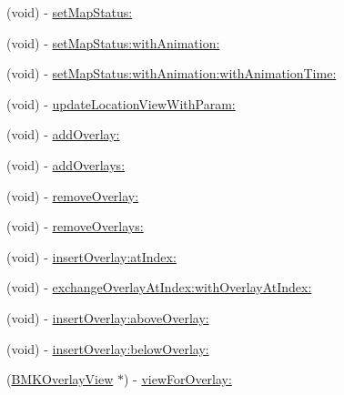 \begin{DoxyCompactItemize}
\item 
(void) -\/ \hyperlink{interface_b_m_k_map_view_a595b3baaa42f35fd5fa3b778011a59d7}{set\-Map\-Status\-:}
\item 
(void) -\/ \hyperlink{interface_b_m_k_map_view_abf8e2308ae62e367f8b1271a9918060f}{set\-Map\-Status\-:with\-Animation\-:}
\item 
(void) -\/ \hyperlink{interface_b_m_k_map_view_a9668d8aa419c7a9140c79846fabc3598}{set\-Map\-Status\-:with\-Animation\-:with\-Animation\-Time\-:}
\item 
(void) -\/ \hyperlink{interface_b_m_k_map_view_a8c19fd34962cb57de9b4998e321b11d4}{update\-Location\-View\-With\-Param\-:}
\item 
(void) -\/ \hyperlink{interface_b_m_k_map_view_af85ad6091568df29d9e7c3dea82a1a2b}{add\-Overlay\-:}
\item 
(void) -\/ \hyperlink{interface_b_m_k_map_view_ab7d29d948515cc6d947d6aa63f904168}{add\-Overlays\-:}
\item 
(void) -\/ \hyperlink{interface_b_m_k_map_view_a3be1f2a019df3ff971f6a36f142e55be}{remove\-Overlay\-:}
\item 
(void) -\/ \hyperlink{interface_b_m_k_map_view_a3eb7909fb1adce117c1de432fd5d816a}{remove\-Overlays\-:}
\item 
(void) -\/ \hyperlink{interface_b_m_k_map_view_adc0775a2651c1e4099f93d9c1bbffe3d}{insert\-Overlay\-:at\-Index\-:}
\item 
(void) -\/ \hyperlink{interface_b_m_k_map_view_a62c1c29b8e5b408ba0c40411a3c1f50f}{exchange\-Overlay\-At\-Index\-:with\-Overlay\-At\-Index\-:}
\item 
(void) -\/ \hyperlink{interface_b_m_k_map_view_ad94b45c4df7978e3a6095918323496d3}{insert\-Overlay\-:above\-Overlay\-:}
\item 
(void) -\/ \hyperlink{interface_b_m_k_map_view_a73dfe9f74d722b7b1fc477e791f34653}{insert\-Overlay\-:below\-Overlay\-:}
\item 
(\hyperlink{interface_b_m_k_overlay_view}{B\-M\-K\-Overlay\-View} $\ast$) -\/ \hyperlink{interface_b_m_k_map_view_aa88093440ad22f7af9cf9a36051f662d}{view\-For\-Overlay\-:}
\end{DoxyCompactItemize}
